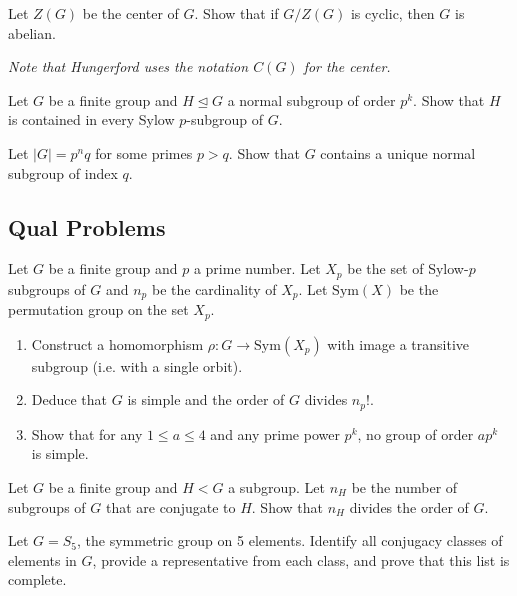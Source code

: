 \begin{problem}[Hungerford 2.4.9]
\label{prob:1.6}
Let $Z(G)$ be the center of $G$. Show that if $G/Z(G)$ is cyclic, then $G$ is abelian.

\textit{Note that Hungerford uses the notation $C(G)$ for the center.}
\end{problem}

\begin{problem}[Hungerford 2.5.6]
\label{prob:1.7}
Let $G$ be a finite group and $H \trianglelefteq G$ a normal subgroup of order $p^k$. Show that $H$ is contained in every Sylow $p$-subgroup of $G$.
\end{problem}

\begin{problem}[Hungerford 2.5.9]
\label{prob:1.8}
Let $\left| G \right| = p^n q$ for some primes $p > q$. Show that $G$ contains a unique normal subgroup of index $q$.
\end{problem}

\subsection{Qual Problems}

\begin{problem}
\label{prob:1.9}
Let $G$ be a finite group and $p$ a prime number. Let $X_p$ be the set of Sylow-$p$ subgroups of $G$ and $n_p$ be the cardinality of $X_p$. Let $\mathrm{Sym}(X)$ be the permutation group on the set $X_p$.
    \begin{enumerate}
        \item Construct a homomorphism $\rho: G \to \mathrm{Sym}(X_p)$ with image a transitive subgroup (i.e. with a single orbit).
        \item Deduce that $G$ is simple and the order of $G$ divides $n_p!$.
        \item Show that for any $1\leq a \leq 4$ and any prime power $p^k$, no group of order $ap^k$ is simple.
    \end{enumerate}
\end{problem}

\begin{problem}
\label{prob:1.10}
Let $G$ be a finite group and $H<G$ a subgroup. Let $n_H$ be the number of subgroups of $G$ that are conjugate to $H$. Show that $n_H$ divides the order of $G$.
\end{problem}

\begin{problem}
\label{prob:1.11}
Let $G=S_5$, the symmetric group on 5 elements. Identify all conjugacy classes of elements in $G$, provide a representative from each class, and prove that this list is complete.
\end{problem}
